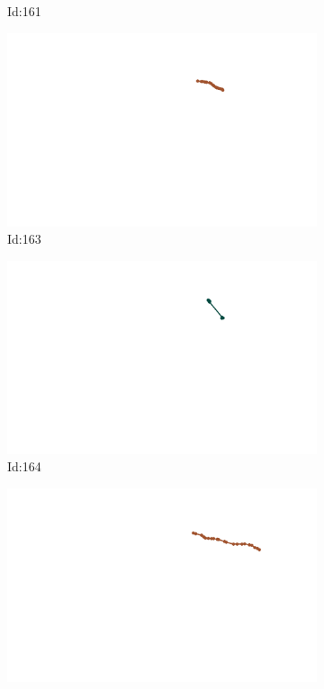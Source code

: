 \documentclass[12pt,twoside]{report}
\begin{document}
\begin{figure}
\begin{subfigure}[b]{0.20\textwidth}
\caption{Id:161}
\end{subfigure}
\begin{subfigure}[b]{0.20\textwidth}
\centering
\includegraphics[width=\textwidth]{../trajectories/163.png}
\caption{Id:163}
\end{subfigure}
\begin{subfigure}[b]{0.20\textwidth}
\centering
\includegraphics[width=\textwidth]{../trajectories/164.png}
\caption{Id:164}
\end{subfigure}
\begin{subfigure}[b]{0.20\textwidth}
\centering
\includegraphics[width=\textwidth]{../trajectories/268.png}

\end{subfigure}
\end{figure}
\end{document}
